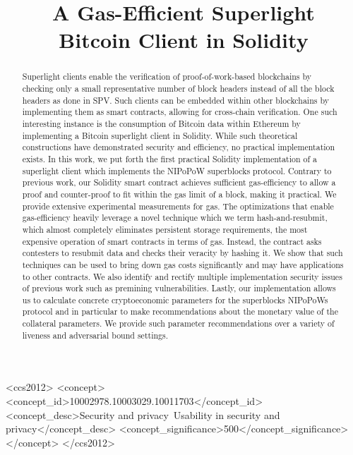 \documentclass[sigconf, anonymous]{acmart}
\begin{document}
\title{A Gas-Efficient Superlight \\Bitcoin Client in Solidity}

\begin{abstract}

Superlight clients enable the verification of proof-of-work-based blockchains
by checking only a small representative number of block headers instead of all
the block headers as done in SPV. Such clients can be embedded within other
blockchains by implementing them as smart contracts, allowing for cross-chain
verification. One such interesting instance is the consumption of Bitcoin data
within Ethereum by implementing a Bitcoin superlight client in Solidity. While
such theoretical constructions have demonstrated security and efficiency, no
practical implementation exists. In this work, we put forth the first practical
Solidity implementation of a superlight client which implements the NIPoPoW
superblocks protocol. Contrary to previous work, our Solidity smart contract
achieves sufficient gas-efficiency to allow a proof and counter-proof to fit
within the gas limit of a block, making it practical. We provide extensive
experimental measurements for gas. The optimizations that enable gas-efficiency
heavily leverage a novel technique which we term hash-and-resubmit, which
almost completely eliminates persistent storage requirements, the most
expensive operation of smart contracts in terms of gas. Instead, the contract
asks contesters to resubmit data and checks their veracity by hashing it. We
show that such techniques can be used to bring down gas costs significantly and
may have applications to other contracts. We also identify and rectify multiple
implementation security issues of previous work such as premining
vulnerabilities. Lastly, our implementation allows us to calculate concrete
cryptoeconomic parameters for the superblocks NIPoPoWs protocol and in
particular to make recommendations about the monetary value of the collateral
parameters. We provide such parameter recommendations over a variety of
liveness and adversarial bound settings.

\end{abstract}


\begin{CCSXML}
<ccs2012>
<concept>
<concept_id>10002978.10003029.10011703</concept_id>
<concept_desc>Security and privacy~Usability in security and privacy</concept_desc>
<concept_significance>500</concept_significance>
</concept>
</ccs2012>
\end{CCSXML}
\end{document}
